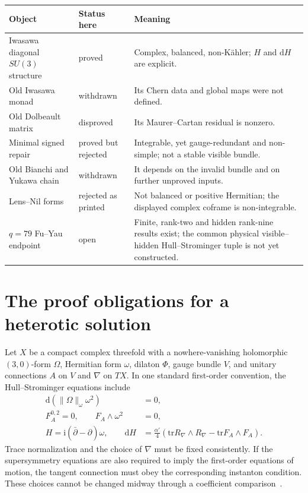 \documentclass[11pt]{article}
\newcommand{\ii}{\mathrm{i}}
\newcommand{\dd}{\mathrm{d}}
\newcommand{\tr}{\mathrm{tr}}
\theoremstyle{definition}
\theoremstyle{remark}
\begin{document}
\begin{center}
\small
\begin{tabular}{>{\raggedright\arraybackslash}p{}
                >{\raggedright\arraybackslash}p{}
                >{\raggedright\arraybackslash}p{}}
\toprule
Object & Status here & Meaning \\
\midrule
Iwasawa diagonal \(SU(3)\) structure & proved &
Complex, balanced, non-K\"ahler; \(H\) and \(\dd H\) are explicit. \\
Old Iwasawa monad & withdrawn &
Its Chern data and global maps were not defined. \\
Old Dolbeault matrix & disproved &
Its Maurer--Cartan residual is nonzero. \\
Minimal signed repair & proved but rejected &
Integrable, yet gauge-redundant and non-simple; not a stable visible bundle. \\
Old Bianchi and Yukawa chain & withdrawn &
It depends on the invalid bundle and on further unproved inputs. \\
Lens--Nil forms & rejected as printed &
Not balanced or positive Hermitian; the displayed complex coframe is non-integrable. \\
\(q=79\) Fu--Yau endpoint & open &
Finite, rank-two and hidden rank-nine results exist; the common physical
visible--hidden Hull--Strominger tuple is not yet constructed. \\
\bottomrule
\end{tabular}
\end{center}

\section{The proof obligations for a heterotic solution}
\label{sec:obligations}

Let \(X\) be a compact complex threefold with a nowhere-vanishing holomorphic
\((3,0)\)-form \(\Omega\), Hermitian form \(\omega\), dilaton \(\Phi\), gauge
bundle \(V\), and unitary connections \(A\) on \(V\) and \(\nabla\) on \(TX\).
In one standard first-order convention, the Hull--Strominger equations include
\begin{align}
\dd\!\left(\|\Omega\|_\omega\omega^2\right)&=0,
\label{eq:balanced}\\
F_A^{0,2}=0,\qquad F_A\wedge\omega^2&=0,
\label{eq:hym}\\
H=\ii(\bar\partial-\partial)\omega,\qquad
\dd H&=\frac{\alpha'}{4}
\left(\tr R_\nabla\wedge R_\nabla-\tr F_A\wedge F_A\right).
\label{eq:bianchi}
\end{align}
Trace normalization and the choice of \(\nabla\) must be fixed consistently.
If the supersymmetry equations are also required to imply the first-order
equations of motion, the tangent connection must obey the corresponding
instanton condition.  These choices cannot be changed midway through a
coefficient comparison~\cite{Strominger1986,Hull1986,DelaOssaSvanes2014}.
\end{document}
